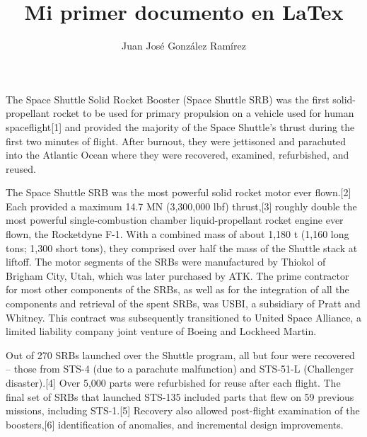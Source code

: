 \documentclass{article}
\title{Mi primer documento en LaTex} %
\author{Juan José González Ramírez}
\begin{document}
\maketitle %
The Space Shuttle Solid Rocket Booster (Space Shuttle SRB) was the first solid-propellant rocket to be used for primary propulsion on a vehicle used for human spaceflight[1] and provided the majority of the Space Shuttle's thrust during the first two minutes of flight. After burnout, they were jettisoned and parachuted into the Atlantic Ocean where they were recovered, examined, refurbished, and reused.

The Space Shuttle SRB was the most powerful solid rocket motor ever flown.[2] Each provided a maximum 14.7 MN (3,300,000 lbf) thrust,[3] roughly double the most powerful single-combustion chamber liquid-propellant rocket engine ever flown, the Rocketdyne F-1. With a combined mass of about 1,180 t (1,160 long tons; 1,300 short tons), they comprised over half the mass of the Shuttle stack at liftoff. The motor segments of the SRBs were manufactured by Thiokol of Brigham City, Utah, which was later purchased by ATK. The prime contractor for most other components of the SRBs, as well as for the integration of all the components and retrieval of the spent SRBs, was USBI, a subsidiary of Pratt and Whitney. This contract was subsequently transitioned to United Space Alliance, a limited liability company joint venture of Boeing and Lockheed Martin.

Out of 270 SRBs launched over the Shuttle program, all but four were recovered – those from STS-4 (due to a parachute malfunction) and STS-51-L (Challenger disaster).[4] Over 5,000 parts were refurbished for reuse after each flight. The final set of SRBs that launched STS-135 included parts that flew on 59 previous missions, including STS-1.[5] Recovery also allowed post-flight examination of the boosters,[6] identification of anomalies, and incremental design improvements.
\end{document}
